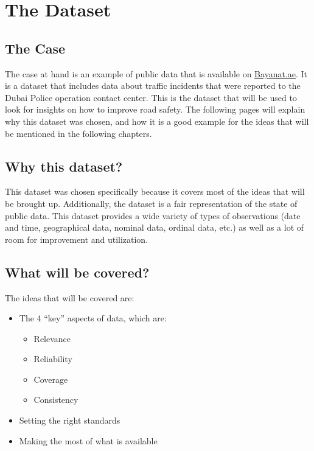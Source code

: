 \documentclass[
]{book}
\providecommand{\tightlist}{%
  \setlength{\itemsep}{0pt}\setlength{\parskip}{0pt}}
\begin{document}
\hypertarget{the-dataset}{%
\chapter{The Dataset}\label{the-dataset}}

\hypertarget{the-case}{%
\section{The Case}\label{the-case}}

The case at hand is an example of public data that is available on \href{https://bayanat.ae}{Bayanat.ae}. It is a dataset that includes data about traffic incidents that were reported to the Dubai Police operation contact center. This is the dataset that will be used to look for insights on how to improve road safety. The following pages will explain why this dataset was chosen, and how it is a good example for the ideas that will be mentioned in the following chapters.

\hypertarget{why-this-dataset}{%
\section{Why this dataset?}\label{why-this-dataset}}

This dataset was chosen specifically because it covers most of the ideas that will be brought up. Additionally, the dataset is a fair representation of the state of public data. This dataset provides a wide variety of types of observations (date and time, geographical data, nominal data, ordinal data, etc.) as well as a lot of room for improvement and utilization.

\hypertarget{what-will-be-covered}{%
\section{What will be covered?}\label{what-will-be-covered}}

The ideas that will be covered are:

\begin{itemize}
\tightlist
\item
  The 4 ``key'' aspects of data, which are:

  \begin{itemize}
  \tightlist
  \item
    Relevance
  \item
    Reliability
  \item
    Coverage
  \item
    Consistency
  \end{itemize}
\item
  Setting the right standards
\item
  Making the most of what is available
\end{itemize}
\end{document}
